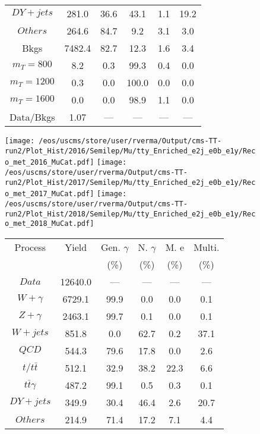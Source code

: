 \begin{figure}
\begin{minipage}[c]{0.32\textwidth}
{\begin{tabular}{cccccc}
$ DY+jets $ &  281.0 &  36.6 &  43.1 &  1.1 &  19.2\\
$ Others $ &  264.6 &  84.7 &  9.2 &  3.1 &  3.0\\
Bkgs &  7482.4 &  82.7 &  12.3 &  1.6 &  3.4\\
$ m_{T} = 800 $ &  8.2 &  0.3 &  99.3 &  0.4 &  0.0\\
$ m_{T} = 1200 $ &  0.3 &  0.0 &  100.0 &  0.0 &  0.0\\
$ m_{T} = 1600 $ &  0.0 &  0.0 &  98.9 &  1.1 &  0.0\\
Data/Bkgs &  1.07 &  --- &  --- &  --- &  ---\\
\hline
\end{tabular}
}
\end{minipage}
\end{figure}

\begin{figure}
\centering
\texttt{[image: /eos/uscms/store/user/rverma/Output/cms-TT-run2/Plot\_Hist/2016/Semilep/Mu/tty\_Enriched\_e2j\_e0b\_e1y/Reco\_met\_2016\_MuCat.pdf]}
\texttt{[image: /eos/uscms/store/user/rverma/Output/cms-TT-run2/Plot\_Hist/2017/Semilep/Mu/tty\_Enriched\_e2j\_e0b\_e1y/Reco\_met\_2017\_MuCat.pdf]}
\texttt{[image: /eos/uscms/store/user/rverma/Output/cms-TT-run2/Plot\_Hist/2018/Semilep/Mu/tty\_Enriched\_e2j\_e0b\_e1y/Reco\_met\_2018\_MuCat.pdf]}
\begin{minipage}[c]{0.32\textwidth}
\centering
\tiny{
\begin{tabular}{cccccc}
\hline
Process & Yield & Gen. $\gamma$ & N. $\gamma$ & M. e & Multi. \\
 &  & (\%) & (\%) & (\%) & (\%)  \\
\hline
                                                                      $ Data $ &  12640.0 &  --- &  --- &  --- &  ---\\
$ W+\gamma $ &  6729.1 &  99.9 &  0.0 &  0.0 &  0.1\\
$ Z+\gamma $ &  2463.1 &  99.7 &  0.1 &  0.0 &  0.1\\
$ W+jets $ &  851.8 &  0.0 &  62.7 &  0.2 &  37.1\\
$ QCD $ &  544.3 &  79.6 &  17.8 &  0.0 &  2.6\\
$ t/t\bar{t} $ &  512.1 &  32.9 &  38.2 &  22.3 &  6.6\\
$ t\bar{t}\gamma $ &  487.2 &  99.1 &  0.5 &  0.3 &  0.1\\
$ DY+jets $ &  349.9 &  30.4 &  46.4 &  2.6 &  20.7\\
$ Others $ &  214.9 &  71.4 &  17.2 &  7.1 &  4.4\\

\end{tabular}}
\end{minipage}
\end{figure}
